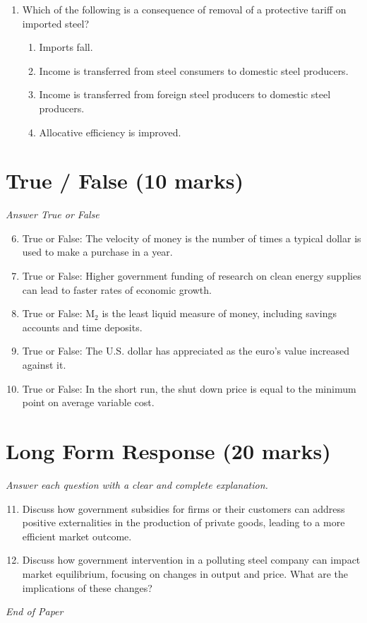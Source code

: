 \documentclass[12pt]{article}
\begin{document}
\begin{enumerate}[label=\arabic*.]
\begin{enumerate}[label=(\alph*)]
    \item changes in the money supply do not have significant effects.
    \item fiscal policy is the preferred way of shifting the aggregate demand curve.
    \item the FED should allow the money supply to grow at a constant rate.
\end{enumerate}
\item Which of the following is a consequence of removal of a protective tariff on imported steel?
\begin{enumerate}[label=(\alph*)]
    \item Imports fall.
    \item Income is transferred from steel consumers to domestic steel producers.
    \item Income is transferred from foreign steel producers to domestic steel producers.
    \item Allocative efficiency is improved.
\end{enumerate}
\end{enumerate}

\section*{True / False (10 marks)}
\textit{Answer True or False}
\begin{enumerate}[label=\arabic*.]
\setcounter{enumi}{5}
\item True or False: The velocity of money is the number of times a typical dollar is used to make a purchase in a year.
\item True or False: Higher government funding of research on clean energy supplies can lead to faster rates of economic growth.
\item True or False: M$_{2}$ is the least liquid measure of money, including savings accounts and time deposits.
\item True or False: The U.S. dollar has appreciated as the euro's value increased against it.
\item True or False: In the short run, the shut down price is equal to the minimum point on average variable cost.
\end{enumerate}

\section*{Long Form Response (20 marks)}
\textit{Answer each question with a clear and complete explanation.}
\begin{enumerate}[label=\arabic*.]
\setcounter{enumi}{10}
\item Discuss how government subsidies for firms or their customers can address positive externalities in the production of private goods, leading to a more efficient market outcome.
\item Discuss how government intervention in a polluting steel company can impact market equilibrium, focusing on changes in output and price. What are the implications of these changes?
\end{enumerate}

\vfill
\noindent\textit{End of Paper}
\end{document}

